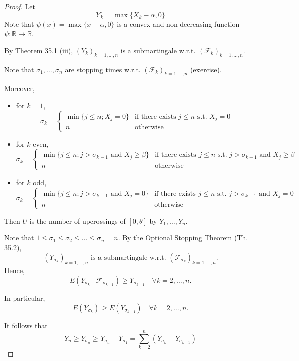 \begin{proof}
Let
\[
Y_k = \max \{ X_k - \alpha, 0 \}
\]
Note that $\psi(x) = \max \{ x - \alpha, 0 \}$ is a convex and non-decreasing function $\psi: \mathbb{R} \to \mathbb{R}$.

By Theorem 35.1 (iii), $(Y_k)_{k=1, \ldots, n}$ is a submartingale w.r.t. $(\mathcal{F}_k)_{k=1, \ldots, n}$.

Note that $\sigma_1, \ldots, \sigma_n$ are stopping times w.r.t. $(\mathcal{F}_k)_{k=1, \ldots, n}$ (exercise).

Moreover,
\begin{itemize}
    \item for $k=1$,
    \[
    \sigma_k = \begin{cases} 
    \min \{ j \leq n ; X_j = 0 \} & \text{if there exists } j \leq n \text{ s.t. } X_j = 0 \\
    n & \text{otherwise}
    \end{cases}
    \]
    \item for $k$ even,
    \[
    \sigma_k = \begin{cases}
    \min \{ j \leq n ; j > \sigma_{k-1} \text{ and } X_j \geq \beta \} & \text{if there exists } j \leq n \text{ s.t. } j > \sigma_{k-1} \text{ and } X_j \geq \beta \\
    n & \text{otherwise}
    \end{cases}
    \]
    \item for $k$ odd,
    \[
    \sigma_k = \begin{cases}
    \min \{ j \leq n ; j > \sigma_{k-1} \text{ and } X_j = 0 \} & \text{if there exists } j \leq n \text{ s.t. } j > \sigma_{k-1} \text{ and } X_j = 0 \\
    n & \text{otherwise}
    \end{cases}
    \]
\end{itemize}

Then $U$ is the number of upcrossings of $[0, \theta]$ by $Y_1, \ldots, Y_n$.

Note that $1 \leq \sigma_1 \leq \sigma_2 \leq \ldots \leq \sigma_n = n$. By the Optional Stopping Theorem (Th. 35.2),
\[
(Y_{\sigma_k})_{k=1, \ldots, n} \text{ is a submartingale w.r.t. } (\mathcal{F}_{\sigma_k})_{k=1, \ldots, n}.
\]
Hence,
\[
E(Y_{\sigma_k} \mid \mathcal{F}_{\sigma_{k-1}}) \geq Y_{\sigma_{k-1}} \quad \forall k=2, \ldots, n.
\]

In particular,
\[
E(Y_{\sigma_k}) \geq E(Y_{\sigma_{k-1}}) \quad \forall k=2, \ldots, n.
\]

It follows that
\[
Y_n \geq Y_{\sigma_n} \geq Y_{\sigma_n} - Y_{\sigma_1} = \sum_{k=2}^{n} (Y_{\sigma_k} - Y_{\sigma_{k-1}})
\]


\end{proof}
